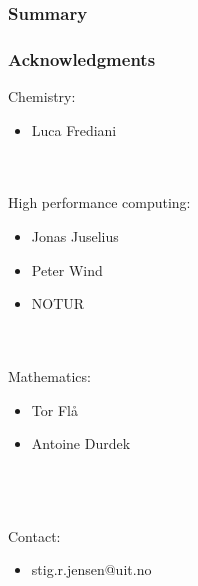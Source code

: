 \documentclass[mathserif]{beamer}
\begin{document}
\begin{frame}
    \frametitle{Summary}
\end{frame}

\begin{frame}
    \frametitle{Acknowledgments}
    Chemistry:
    \begin{itemize}
	\item Luca Frediani
    \end{itemize}
    \ \\
    \ \\
    High performance computing:
    \begin{itemize}
    	\item Jonas Juselius
    	\item Peter Wind
	\item NOTUR
    \end{itemize}
    \ \\
    \ \\
    Mathematics:
    \begin{itemize}
	\item Tor Fl\aa
	\item Antoine Durdek
    \end{itemize}
    \ \\
    \ \\
    \ \\
    Contact:
    \begin{itemize}
	\item stig.r.jensen@uit.no
    \end{itemize}
\end{frame}
\end{document}

